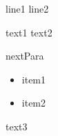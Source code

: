 line1
line2



text1 %
text2

nextPara
\begin{itemize}
\item item1
\item item2
\end{itemize}

text3


